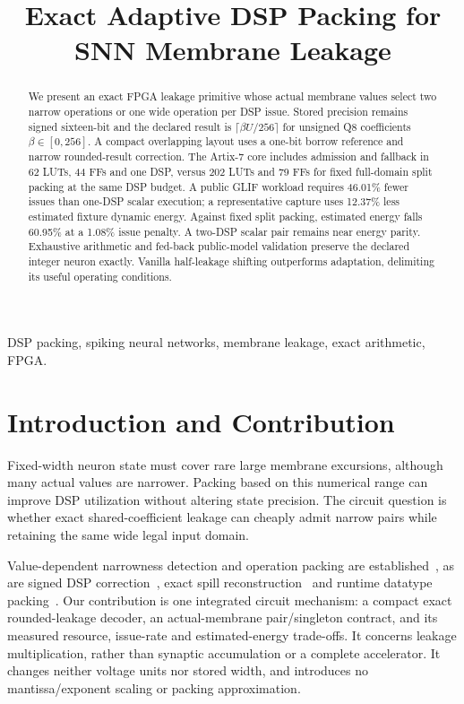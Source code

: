 \documentclass[conference]{IEEEtran}
\title{Exact Adaptive DSP Packing for SNN Membrane Leakage}
\author{\IEEEauthorblockN{X}\IEEEauthorblockA{X}}
\begin{document}
\maketitle
\begin{abstract}
We present an exact FPGA leakage primitive whose actual membrane values select two narrow operations or one wide operation per DSP issue. Stored precision remains signed sixteen-bit and the declared result is $\lceil\beta U/256\rceil$ for unsigned Q8 coefficients $\beta\in[0,256]$. A compact overlapping layout uses a one-bit borrow reference and narrow rounded-result correction. The Artix-7 core includes admission and fallback in 62 LUTs, 44 FFs and one DSP, versus 202 LUTs and 79 FFs for fixed full-domain split packing at the same DSP budget. A public GLIF workload requires 46.01\% fewer issues than one-DSP scalar execution; a representative capture uses 12.37\% less estimated fixture dynamic energy. Against fixed split packing, estimated energy falls 60.95\% at a 1.08\% issue penalty. A two-DSP scalar pair remains near energy parity. Exhaustive arithmetic and fed-back public-model validation preserve the declared integer neuron exactly. Vanilla half-leakage shifting outperforms adaptation, delimiting its useful operating conditions.
\end{abstract}
\begin{IEEEkeywords}
DSP packing, spiking neural networks, membrane leakage, exact arithmetic, FPGA.
\end{IEEEkeywords}

\section{Introduction and Contribution}
Fixed-width neuron state must cover rare large membrane excursions, although many actual values are narrower. Packing based on this numerical range can improve DSP utilization without altering state precision. The circuit question is whether exact shared-coefficient leakage can cheaply admit narrow pairs while retaining the same wide legal input domain.

Value-dependent narrowness detection and operation packing are established~\cite{brooks}, as are signed DSP correction~\cite{dsppack}, exact spill reconstruction~\cite{wide} and runtime datatype packing~\cite{xtramac}. Our contribution is one integrated circuit mechanism: a compact exact rounded-leakage decoder, an actual-membrane pair/singleton contract, and its measured resource, issue-rate and estimated-energy trade-offs. It concerns leakage multiplication, rather than synaptic accumulation or a complete accelerator. It changes neither voltage units nor stored width, and introduces no mantissa/exponent scaling or packing approximation.
\end{document}
